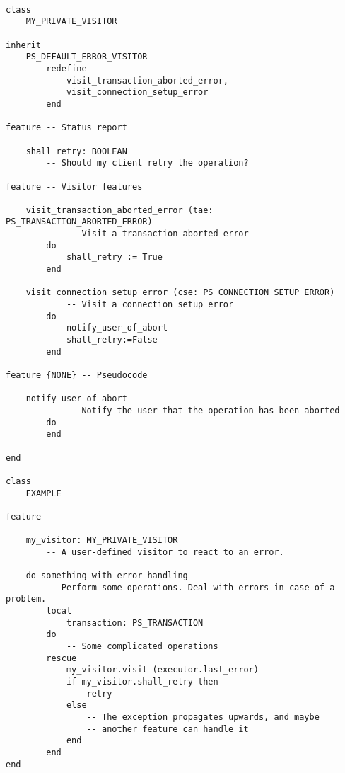 \documentclass[a4paper,12pt]{report}
\begin{document}
\begin{lstlisting}[language=OOSC2Eiffel, captionpos=b, caption={Sample error handling using a visitor.}, label={lst:error_visitor_example}]

class
	MY_PRIVATE_VISITOR

inherit
	PS_DEFAULT_ERROR_VISITOR
		redefine
			visit_transaction_aborted_error,
			visit_connection_setup_error
		end

feature -- Status report

	shall_retry: BOOLEAN
		-- Should my client retry the operation?

feature -- Visitor features

	visit_transaction_aborted_error (tae: PS_TRANSACTION_ABORTED_ERROR)
			-- Visit a transaction aborted error
		do
			shall_retry := True
		end

	visit_connection_setup_error (cse: PS_CONNECTION_SETUP_ERROR)
			-- Visit a connection setup error
		do
			notify_user_of_abort
			shall_retry:=False
		end

feature {NONE} -- Pseudocode

	notify_user_of_abort
			-- Notify the user that the operation has been aborted
		do
		end

end

class
	EXAMPLE

feature

	my_visitor: MY_PRIVATE_VISITOR
		-- A user-defined visitor to react to an error.

	do_something_with_error_handling
		-- Perform some operations. Deal with errors in case of a problem.
		local
			transaction: PS_TRANSACTION
		do
			-- Some complicated operations
		rescue
			my_visitor.visit (executor.last_error)
			if my_visitor.shall_retry then
				retry
			else
				-- The exception propagates upwards, and maybe
				-- another feature can handle it
			end
		end
end


\end{lstlisting}
\end{document}
